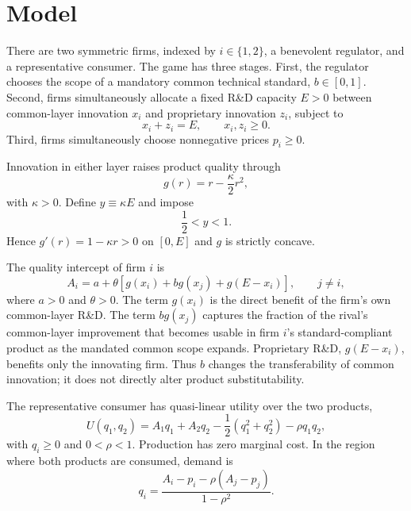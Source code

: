 \section{Model}

There are two symmetric firms, indexed by $i\in\{1,2\}$, a benevolent regulator, and a representative consumer. The game has three stages. First, the regulator chooses the scope of a mandatory common technical standard, $b\in[0,1]$. Second, firms simultaneously allocate a fixed R\&D capacity $E>0$ between common-layer innovation $x_i$ and proprietary innovation $z_i$, subject to
\begin{equation}
 x_i+z_i=E,\qquad x_i,z_i\geq 0.
\end{equation}
Third, firms simultaneously choose nonnegative prices $p_i\geq0$.

Innovation in either layer raises product quality through
\begin{equation}
 g(r)=r-\frac{\kappa}{2}r^2,
\end{equation}
with $\kappa>0$. Define $y\equiv \kappa E$ and impose
\begin{equation}
 \frac12<y<1.
 \label{eq:yregion}
\end{equation}
Hence $g'(r)=1-\kappa r>0$ on $[0,E]$ and $g$ is strictly concave.

The quality intercept of firm $i$ is
\begin{equation}
 A_i=a+\theta\left[g(x_i)+b g(x_j)+g(E-x_i)\right],\qquad j\neq i,
 \label{eq:quality}
\end{equation}
where $a>0$ and $\theta>0$. The term $g(x_i)$ is the direct benefit of the firm's own common-layer R\&D. The term $b g(x_j)$ captures the fraction of the rival's common-layer improvement that becomes usable in firm $i$'s standard-compliant product as the mandated common scope expands. Proprietary R\&D, $g(E-x_i)$, benefits only the innovating firm. Thus $b$ changes the transferability of common innovation; it does not directly alter product substitutability.

The representative consumer has quasi-linear utility over the two products,
\begin{equation}
 U(q_1,q_2)=A_1q_1+A_2q_2-\frac12(q_1^2+q_2^2)-\rho q_1q_2,
 \label{eq:utility}
\end{equation}
with $q_i\geq0$ and $0<\rho<1$. Production has zero marginal cost. In the region where both products are consumed, demand is
\begin{equation}
 q_i=\frac{A_i-p_i-\rho(A_j-p_j)}{1-\rho^2}.
 \label{eq:demand}
\end{equation}

